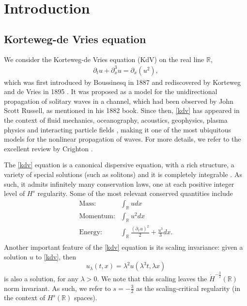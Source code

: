 \documentclass[%
11pt,  reqno]{amsart}
\newcommand{\blue}{\color{blue}}
\newcommand{\5}{\textup{V}}
\newcommand{\dx}{\partial_x}
\newcommand{\dt}{\partial_t}
\theoremstyle{remark}
\newcommand{\R}{\mathbb{R}}
\numberwithin{equation}{section}
\numberwithin{theorem}{section}
\begin{document}
		



    
    \section{Introduction}


    \subsection{Korteweg-de Vries equation}


We consider the Korteweg-de Vries equation (KdV) on the real line $\R$,
	\begin{align}
		\label{kdv}\tag{KdV}
		\dt u + \dx^3 u = \dx(u^2),
	\end{align}
	which was first introduced by Boussinesq in 1887 \cite{Boussinesq} and rediscovered by Korteweg and de Vries in 1895 \cite{KortewegDeVries}. It was proposed as a model for the unidirectional propagation of solitary waves in a channel, which had been observed by John Scott Russell, as mentioned in his 1882 book\cite{Russell}. Since then, \eqref{kdv} has appeared in the context of fluid mechanics, oceanography, acoustics, geophysics, plasma physics and interacting particle fields \cite{Fordy, CCR_particle,  Kuznetsov_Nakoryakov_Pokusaev_Shreiber_1978,    Nezlin, OlsonChristensen, StewartCorones,WashimiTaniuti}, making it one of the most ubiquitous models for the nonlinear propagation of waves. For more details, we refer to the excellent review by Crighton \cite{Crighton}.
	
	\medskip

The \eqref{kdv} equation is a canonical dispersive equation, with a rich structure, a variety of special solutions (such as solitons) and it is completely integrable \cite{ZakharovFadeev}. As such, it admits infinitely many conservation laws, one at each positive integer level of $H^s$ regularity. Some of the most relevant conserved quantities include
\begin{align*}
\text{Mass:}& \int_\R u dx\\
\text{Momentum:}& \int_\R u^2 dx\\
\text{Energy:}& \int_\R \frac{(\dx u)^2}{2} + \frac{u^3}{3}  dx.\\
\end{align*}
Another important feature of the \eqref{kdv} equation is its scaling invariance: given a solution $u$ to \eqref{kdv}, then
\begin{equation}\label{scaling}
u_\lambda(t,x)=\lambda^{2}u(\lambda^3 t, \lambda x)
\end{equation}
is also a solution, for any $\lambda>0$. We note that this scaling leaves the $\dot H^{-\frac32}(\R)$ norm invariant. As such, we refer to $s=-\frac32$ as the scaling-critical regularity (in the context of $H^s(\R)$ spaces). 
\end{document}
